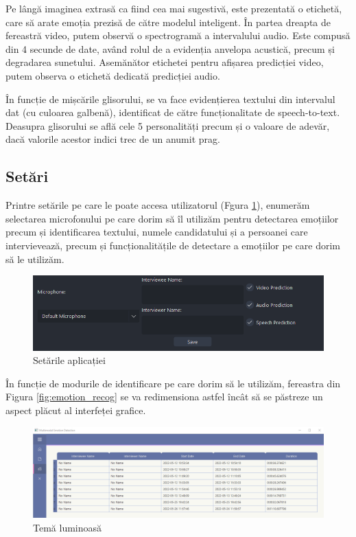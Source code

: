 \documentclass[a4paper, 12pt]{report}
\begin{document}
	Pe lângă imaginea extrasă ca fiind cea mai sugestivă, este prezentată o etichetă, care să arate emoția prezisă de către modelul inteligent. În partea dreapta de fereastră video, putem observă o spectrogramă a intervalului audio. Este compusă din 4 secunde de date, având rolul de a evidenția anvelopa acustică, precum și degradarea sunetului. Asemănător etichetei pentru afișarea predicției video, putem observa o etichetă dedicată predicției audio.
	
	În funcție de mișcările glisorului, se va face evidențierea textului din intervalul dat (cu culoarea galbenă), identificat de către funcționalitate de speech-to-text. Deasupra glisorului se află cele 5 personalități precum și o valoare de adevăr, dacă valorile acestor indici trec de un anumit prag.
	
	\clearpage
	\subsection{Setări}
	Printre setările pe care le poate accesa utilizatorul (Fgura \ref{fig:settings}), enumerăm selectarea microfonului pe care dorim să îl utilizăm pentru detectarea emoțiilor precum și identificarea textului, numele candidatului și a persoanei care intervievează, precum și funcționalitățile de detectare a emoțiilor pe care dorim să le utilizăm.
	
	\begin{figure}[H]
		\begin{center}
			\includegraphics[scale=0.65]{images/settings.png}
		\end{center}
		\caption{Setările aplicației}
		\label{fig:settings}
	\end{figure}

	În funcție de modurile de identificare pe care dorim să le utilizăm, fereastra din Figura \ref{fig:emotion_recog} se va redimensiona astfel încât să se păstreze un aspect plăcut al interfeței grafice.
	
	\begin{figure}[H]
		\begin{center}
			\includegraphics[scale=0.3]{images/light_theme.png}
		\end{center}
		\caption{Temă luminoasă}
		\label{fig:light_theme}
	\end{figure}
	
\end{document}
